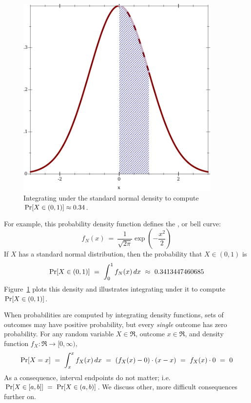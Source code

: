 \begin{figure}[tb]\centering
\includegraphics[width=4in]{figures/density-integrate}
\caption[Computing probabilities using the standard normal density function]{Integrating under the standard normal density to compute $\mathrm{Pr}\!\left[{X \in (0,1)}\right] \approx 0.34$.}
\label{fig:density-integrate}
\end{figure}

For example, this probability density function defines the , or bell curve:
\begin{equation}
	f_N(x)\ =\ \frac{1}{\sqrt{2\pi}} \exp\left(-\frac{x^2}{2}\right)
\end{equation}
If $X$ has a standard normal distribution, then the probability that $X \in (0,1)$ is
\begin{equation}
	\mathrm{Pr}\!\left[{X \in (0,1)}\right]\ =\ \int_0^1 f_N(x)\,dx\ \approx\ 0.3413447460685
\end{equation}
Figure~\ref{fig:density-integrate} plots this density and illustrates integrating under it to compute $\mathrm{Pr}\!\left[{X \in (0,1)}\right]$.

When probabilities are computed by integrating density functions, sets of outcomes may have positive probability, but every \emph{single} outcome has zero probability.
For any random variable $X \in \Re$, outcome $x \in \Re$, and density function $f_X : \Re \to [0,\infty)$,
\begin{equation}
	\Pspec{X = x}\ =\ \int_x^x f_X(x)\, dx\ =\ (f_X(x) - 0) \cdot (x - x)\ =\ f_X(x) \cdot 0\ =\ 0
\end{equation}
As a consequence, interval endpoints do not matter; i.e. $\mathrm{Pr}\!\left[{X \in [a,b]}\right]\ =\ \mathrm{Pr}\!\left[{X \in (a,b)}\right]$.
We discuss other, more difficult consequences further on.

